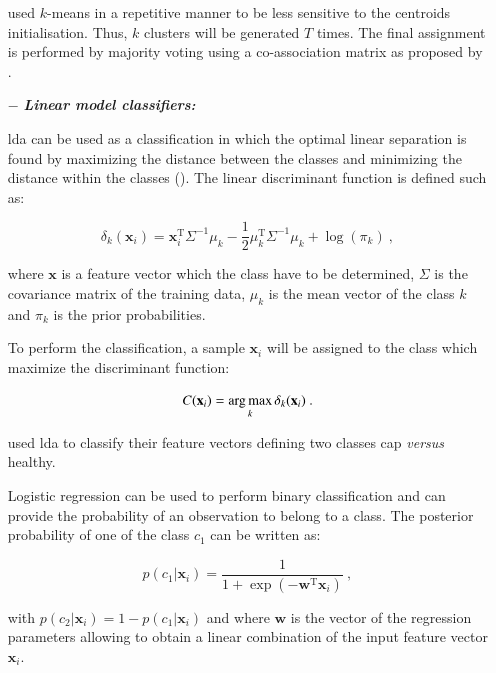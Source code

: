 \begin{enumerate}[leftmargin=*]
\cite{Tiwari2008,Viswanath2008,Viswanath2008a} used $k$-means in a repetitive manner to be less sensitive to the centroids initialisation. Thus, $k$ clusters will be generated $T$ times. The final assignment is performed by majority voting using a co-association matrix as proposed by \cite{Fred2005}.

\item[$-$] \textbf{\textit{Linear model classifiers:}} 

\Acf{lda} can be used as a classification in which the optimal linear separation is found by maximizing the distance between the classes and minimizing the distance within the classes (\cite{Friedman1989}). The linear discriminant function is defined such as:

\begin{equation}
	\delta_{k}(\mathbf{x}_i) = \mathbf{x}_i^{\text{T}} \Sigma^{-1} \mu_k - \frac{1}{2} \mu_{k}^{\text{T}} \Sigma^{-1} \mu_k + \log (\pi_k) \ ,
	\label{eq:ldafun}
\end{equation}

\noindent where $\mathbf{x}$ is a feature vector which the class have to be determined, $\Sigma$ is the covariance matrix of the training data, $\mu_k$ is the mean vector of the class $k$ and $\pi_k$ is the prior probabilities.

To perform the classification, a sample $\mathbf{x}_i$ will be assigned to the class which maximize the discriminant function:

\begin{equation}
	C(\mathbf{x}_i) = \operatorname*{arg\,max}_k \delta_k(\mathbf{x}_i) \ .
	\label{eq:ldaclass}
\end{equation}

\cite{Antic2013,Chan2003,Niaf2011,Niaf2012,Vos2012} used \ac{lda} to classify their feature vectors defining two classes \ac{cap} \textit{versus} healthy.

Logistic regression can be used to perform binary classification and can provide the probability of an observation to belong to a class. The posterior probability of one of the class $c_1$ can be written as:

\begin{equation}
	p(c_1|\mathbf{x}_i) = \frac{1}{1+\exp(-\mathbf{w}^{\text{T}}\mathbf{x}_i)} \ ,
	\label{eq:postprlr}
\end{equation}

\noindent with $p(c_2|\mathbf{x}_i) = 1 - p(c_1|\mathbf{x}_i)$ and where $\mathbf{w}$ is the vector of the regression parameters allowing to obtain a linear combination of the input feature vector $\mathbf{x}_i$.


\end{enumerate}
